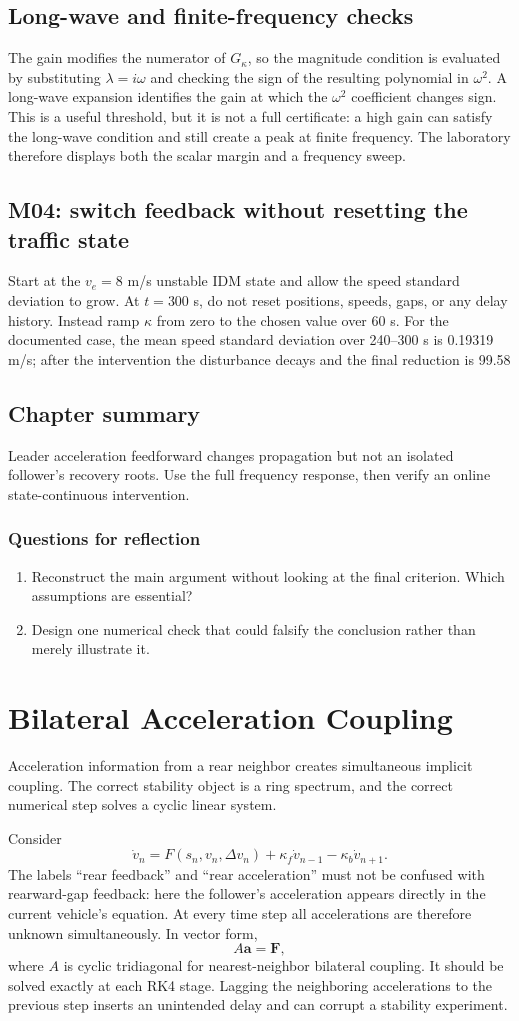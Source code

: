 \documentclass[11pt,a4paper,openany]{book}
\numberwithin{equation}{chapter}
\numberwithin{figure}{chapter}
\numberwithin{table}{chapter}
\newcommand{\chapterguide}[1]{\begin{tcolorbox}[keybox,title=Chapter guide]#1\end{tcolorbox}}
\newcommand{\chapterend}[1]{\section*{Chapter summary}\addcontentsline{toc}{section}{Chapter summary}\begin{tcolorbox}[resultbox]#1\end{tcolorbox}\subsection*{Questions for reflection}\begin{enumerate}[leftmargin=1.7em]\item Reconstruct the main argument without looking at the final criterion. Which assumptions are essential?\item Design one numerical check that could falsify the conclusion rather than merely illustrate it.\end{enumerate}\clearpage}
\begin{document}
\section{Long-wave and finite-frequency checks}
The gain modifies the numerator of $G_\kappa$, so the magnitude condition is evaluated by substituting $\lambda=i\omega$ and checking the sign of the resulting polynomial in $\omega^2$. A long-wave expansion identifies the gain at which the $\omega^2$ coefficient changes sign. This is a useful threshold, but it is not a full certificate: a high gain can satisfy the long-wave condition and still create a peak at finite frequency. The laboratory therefore displays both the scalar margin and a frequency sweep.

\section{M04: switch feedback without resetting the traffic state}
Start at the $v_e=8$ m/s unstable IDM state and allow the speed standard deviation to grow. At $t=300$ s, do not reset positions, speeds, gaps, or any delay history. Instead ramp $\kappa$ from zero to the chosen value over 60 s. For the documented case, the mean speed standard deviation over 240--300 s is 0.19319 m/s; after the intervention the disturbance decays and the final reduction is 99.58%

\chapterend{Leader acceleration feedforward changes propagation but not an isolated follower's recovery roots. Use the full frequency response, then verify an online state-continuous intervention.}

\chapter{Bilateral Acceleration Coupling}
\chapterguide{Acceleration information from a rear neighbor creates simultaneous implicit coupling. The correct stability object is a ring spectrum, and the correct numerical step solves a cyclic linear system.}

Consider
\begin{equation}
\dot v_n=F(s_n,v_n,\Delta v_n)+\kappa_f\dot v_{n-1}-\kappa_b\dot v_{n+1}.
\end{equation}
The labels ``rear feedback'' and ``rear acceleration'' must not be confused with rearward-gap feedback: here the follower's acceleration appears directly in the current vehicle's equation. At every time step all accelerations are therefore unknown simultaneously. In vector form,
\begin{equation}
A\bm a=\bm F,
\end{equation}
where $A$ is cyclic tridiagonal for nearest-neighbor bilateral coupling. It should be solved exactly at each RK4 stage. Lagging the neighboring accelerations to the previous step inserts an unintended delay and can corrupt a stability experiment.
\end{document}
